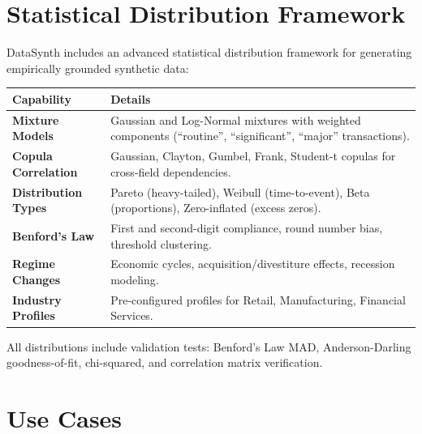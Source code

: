 \documentclass[11pt,a4paper]{article}
\begin{document}
\section{Statistical Distribution Framework}

DataSynth includes an advanced statistical distribution framework for generating
empirically grounded synthetic data:

\vspace{0.4em}
\noindent
\renewcommand{\arraystretch}{1.2}
\begin{tabularx}{\textwidth}{>{\bfseries\color{brand}}l X}
\toprule
\textbf{Capability} & \textbf{Details} \\
\midrule
Mixture Models &
  Gaussian and Log-Normal mixtures with weighted components (``routine'', ``significant'', ``major'' transactions). \\
Copula Correlation &
  Gaussian, Clayton, Gumbel, Frank, Student-t copulas for cross-field dependencies. \\
Distribution Types &
  Pareto (heavy-tailed), Weibull (time-to-event), Beta (proportions), Zero-inflated (excess zeros). \\
Benford's Law &
  First and second-digit compliance, round number bias, threshold clustering. \\
Regime Changes &
  Economic cycles, acquisition/divestiture effects, recession modeling. \\
Industry Profiles &
  Pre-configured profiles for Retail, Manufacturing, Financial Services. \\
\bottomrule
\end{tabularx}
\renewcommand{\arraystretch}{1.0}

\vspace{0.3em}
\noindent
All distributions include validation tests: Benford's Law MAD, Anderson-Darling
goodness-of-fit, chi-squared, and correlation matrix verification.

\section{Use Cases}
\end{document}

